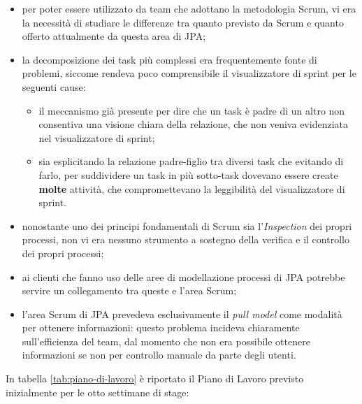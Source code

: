 \begin{itemize}
\item per poter essere utilizzato da team che adottano la metodologia Scrum,
  vi era la necessità di studiare le differenze tra quanto previsto da Scrum e
  quanto offerto attualmente da questa area di JPA;
\item la decomposizione dei task più complessi era frequentemente fonte di
  problemi, siccome rendeva poco comprensibile il visualizzatore di sprint per
  le seguenti cause:
  \begin{itemize}
  \item il meccanismo già presente per dire che un task è padre di un altro non
    consentiva una visione chiara della relazione, che non veniva evidenziata
    nel visualizzatore di sprint;
  \item sia esplicitando la relazione padre-figlio tra diversi task che
    evitando di farlo, per suddividere un task in più sotto-task dovevano
    essere create \textbf{molte} attività, che compromettevano la leggibilità
    del visualizzatore di sprint.
  \end{itemize}
\item nonostante uno dei principi fondamentali di Scrum sia l'\emph{Inspection}
  dei propri processi, non vi era nessuno strumento a sostegno della verifica
  e il controllo dei propri processi;
\item ai clienti che fanno uso delle aree di modellazione processi di JPA
  potrebbe servire un collegamento tra queste e l'area Scrum;
\item l'area Scrum di JPA prevedeva esclusivamente il \emph{pull model} come
  modalità per ottenere informazioni: questo problema incideva chiaramente
  sull'efficienza del team, dal momento che non era possibile ottenere
  informazioni se non per controllo manuale da parte degli utenti.
\end{itemize}

In tabella \ref{tab:piano-di-lavoro} è riportato il Piano di Lavoro previsto
inizialmente per le otto settimane di stage: \\

